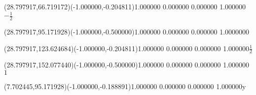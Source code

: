 \documentclass[12pt]{article}
\begin{document}
%
%
\fontsize{12.000000}{14.400000}\selectfont%
\ASYalignT(28.797917,66.719172)(-1.000000,-0.204811){1.000000 0.000000 0.000000 1.000000}{\vphantom{$10^4$}$-\frac{1}{2}$}%
%
%
\fontsize{12.000000}{14.400000}\selectfont%
\ASYalignT(28.797917,95.171928)(-1.000000,-0.500000){1.000000 0.000000 0.000000 1.000000}{\vphantom{$10^4$}$0$}%
%
%
\fontsize{12.000000}{14.400000}\selectfont%
\ASYalignT(28.797917,123.624684)(-1.000000,-0.204811){1.000000 0.000000 0.000000 1.000000}{\vphantom{$10^4$}$\frac{1}{2}$}%
%
%
\fontsize{12.000000}{14.400000}\selectfont%
\ASYalignT(28.797917,152.077440)(-1.000000,-0.500000){1.000000 0.000000 0.000000 1.000000}{\vphantom{$10^4$}$1$}%
%
%
\fontsize{12.000000}{14.400000}\selectfont%
\ASYalignT(7.702445,95.171928)(-1.000000,-0.188891){1.000000 0.000000 0.000000 1.000000}{y}%
\end{document}
